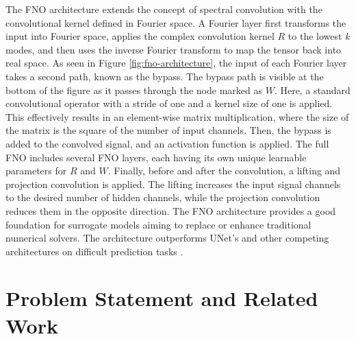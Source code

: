 \documentclass{article}
\begin{document}
The FNO architecture \citep{li2020fourier} extends the concept of spectral convolution with the convolutional kernel defined in Fourier space. A Fourier layer first transforms the input into Fourier space, applies the complex convolution kernel $R$ to the lowest $k$ modes, and then uses the inverse Fourier transform to map the tensor back into real space. As seen in Figure \ref{fig:fno-architecture}, the input of each Fourier layer takes a second path, known as the bypass. The bypass path is visible at the bottom of the figure as it passes through the node marked as $W$. Here, a standard convolutional operator with a stride of one and a kernel size of one is applied. This effectively results in an element-wise matrix multiplication, where the size of the matrix is the square of the number of input channels. Then, the bypass is added to the convolved signal, and an activation function is applied. The full FNO includes several FNO layers, each having its own unique learnable parameters for $R$ and $W$. Finally, before and after the convolution, a lifting and projection convolution is applied. The lifting increases the input signal channels to the desired number of hidden channels, while the projection convolution reduces them in the opposite direction. 
The FNO architecture provides a good foundation for surrogate models aiming to replace or enhance traditional numerical solvers. The architecture outperforms UNet's and other competing architectures on difficult prediction tasks \citep{koehler2024apebench}.







\newpage
\section{Problem Statement and Related Work}
\end{document}
